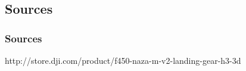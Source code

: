 \subsection{Sources}

\begin{frame}
\frametitle{Sources}

http://store.dji.com/product/f450-naza-m-v2-landing-gear-h3-3d


  
\end{frame}





